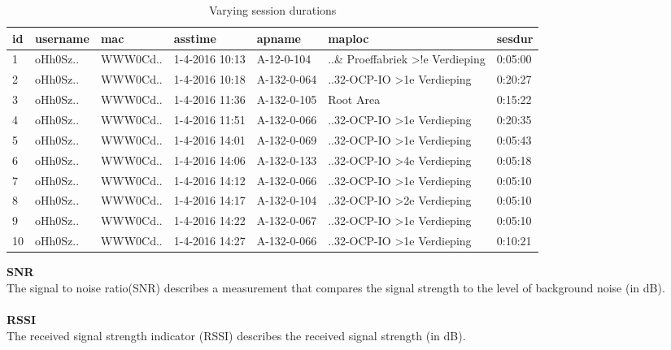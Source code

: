 \begin{table}[H]
	\centering
	\captionsetup{justification=centering}
	\caption{Varying session durations}
	\label{sesdur_example}
	\begin{tabular}{@{}lllllll@{}}
		\toprule
		\textbf{id} & \textbf{username} & \textbf{mac} & \textbf{asstime} & \textbf{apname} & \textbf{maploc}                                                                     & \textbf{sesdur} \\ \midrule
		1           & oHh0Sz..      & WWW0Cd.. & 1-4-2016 10:13   & A-12-0-104      & ..\& Proeffabriek \textgreater !e Verdieping                 & 0:05:00         \\
		2           & oHh0Sz..      & WWW0Cd.. & 1-4-2016 10:18   & A-132-0-064     & ..32-OCP-IO \textgreater 1e Verdieping                     & 0:20:27         \\
		3           & oHh0Sz..      & WWW0Cd.. & 1-4-2016 11:36   & A-132-0-105     & Root Area                                                                           & 0:15:22         \\
		4           & oHh0Sz..      & WWW0Cd.. & 1-4-2016 11:51   & A-132-0-066     & ..32-OCP-IO \textgreater 1e Verdieping                     & 0:20:35         \\
		5           & oHh0Sz..      & WWW0Cd.. & 1-4-2016 14:01   & A-132-0-069     & ..32-OCP-IO \textgreater 1e Verdieping                     & 0:05:43         \\
		6           & oHh0Sz..      & WWW0Cd.. & 1-4-2016 14:06   & A-132-0-133     & ..32-OCP-IO \textgreater 4e Verdieping                     & 0:05:18         \\
		7           & oHh0Sz..      & WWW0Cd.. & 1-4-2016 14:12   & A-132-0-066     & ..32-OCP-IO \textgreater 1e Verdieping                     & 0:05:10         \\
		8           & oHh0Sz..      & WWW0Cd.. & 1-4-2016 14:17   & A-132-0-104     & ..32-OCP-IO \textgreater 2e Verdieping                     & 0:05:10         \\
		9           & oHh0Sz..      & WWW0Cd.. & 1-4-2016 14:22   & A-132-0-067     & ..32-OCP-IO \textgreater 1e Verdieping                     & 0:05:10         \\
		10          & oHh0Sz..      & WWW0Cd.. & 1-4-2016 14:27   & A-132-0-066     & ..32-OCP-IO \textgreater 1e Verdieping                     & 0:10:21         \\ \bottomrule
	\end{tabular}
\end{table}
\textbf{SNR}\\
The signal to noise ratio(SNR) describes a measurement that compares the signal strength to the level of background noise (in dB).\\\\
\textbf{RSSI} \\
The received signal strength indicator (RSSI) describes the received signal strength (in dB).

